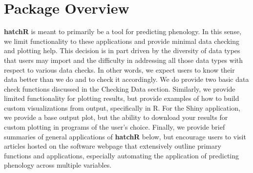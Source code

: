 \documentclass[webpdf,large,contemporary,namedate]{oup-authoring-template}
\theoremstyle{thmstyleone}
\theoremstyle{thmstyletwo}
\theoremstyle{thmstylethree}
\begin{document}
\section{Package Overview}\label{package-overview}

\textbf{hatchR} is meant to primarily be a tool for predicting
phenology. In this sense, we limit functionality to these applications
and provide minimal data checking and plotting help. This decision is in
part driven by the diversity of data types that users may import and the
difficulty in addressing all those data types with respect to various
data checks. In other words, we expect users to know their data better
than we do and to check it accordingly. We do provide two basic data
check functions discussed in the Checking Data section. Similarly, we
provide limited functionality for plotting results, but provide examples
of how to build custom visualizations from output, specifically in R.
For the Shiny application, we provide a base output plot, but the
ability to download your results for custom plotting in programs of the
user's choice. Finally, we provide brief summaries of general
applications of \textbf{hatchR} below, but encourage users to visit
articles hosted on the software webpage that extensively outline primary
functions and applications, especially automating the application of
predicting phenology across multiple variables.
\end{document}
